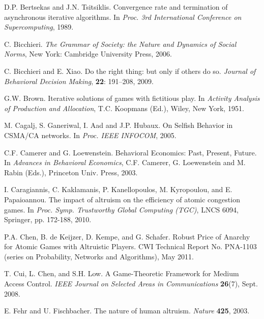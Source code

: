\documentclass[12pt,onecolumn,draftcls]{IEEEtran}
\begin{document}
\begin{thebibliography}{9}
D.P. Bertsekas and J.N. Tsitsiklis.
Convergence rate and termination of asynchronous iterative algorithms.
In {\em Proc. 3rd International Conference on Supercomputing}, 1989.

C. Bicchieri.
{\em The Grammar of Society: the Nature and Dynamics of Social Norms},
New York: Cambridge University Press, 2006.

C. Bicchieri and E. Xiao. 
Do the right thing: but only if others do so. 
{\em Journal of Behavioral Decision Making}, 
{\bf 22}: 191–208, 2009.








G.W. Brown. 
\newblock Iterative solutions of games with fictitious play.
\newblock In {\em Activity Analysis of Production 
and Allocation}, T.C. Koopmans (Ed.), Wiley, New York, 1951.



M. Cagalj, S. Ganeriwal, I. Aad and J.P. Hubaux.
On Selfish Behavior in CSMA/CA networks.
In {\em Proc. IEEE INFOCOM}, 2005.

C.F. Camerer and G. Loewenstein.  Behavioral Economics: Past, Present, Future.
In {\em Advances in Behavioral Economics},
C.F. Camerer, G. Loewenstein and M. Rabin (Eds.),
Princeton Univ. Press, 2003.

I. Caragiannis, C. Kaklamanis, P. Kanellopoulos, M. Kyropoulou, and 
E. Papaioannou. 
The impact of altruism on the efficiency of atomic congestion games. 
In {\em Proc. Symp. Trustworthy Global Computing (TGC)}, LNCS 6094, 
Springer, pp. 172-188, 2010.

P.A. Chen, B. de Keijzer, D. Kempe, and G. Schafer.
Robust Price of Anarchy for  Atomic   Games  with Altruistic  Players.
CWI Technical Report No. PNA-1103
(series on Probability, Networks and Algorithms), May 2011.

T. Cui, L. Chen, and S.H. Low.
A Game-Theoretic Framework for Medium Access Control.
{\em IEEE Journal on Selected Areas in Communications}
{\bf 26}(7), Sept. 2008.



E. Fehr and U. Fischbacher.
The nature of human altruism.
{\em Nature} {\bf 425}, 2003.






\end{thebibliography}
\end{document}
